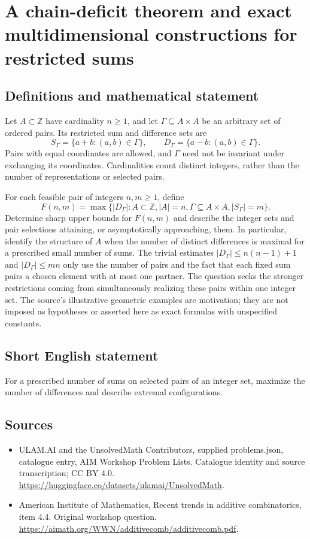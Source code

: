 \documentclass[11pt,a4paper]{article}
\begin{document}
\section*{A chain-deficit theorem and exact multidimensional constructions for restricted sums}\label{statement}

\subsection{Definitions and mathematical statement}
Let $A\subset\mathbb Z$ have cardinality $n\geq1$, and let $\Gamma\subseteq A\times A$ be an arbitrary set of ordered pairs.
Its restricted sum and difference sets are
\[
 S_\Gamma=\{a+b:(a,b)\in\Gamma\},\qquad
 D_\Gamma=\{a-b:(a,b)\in\Gamma\}.
\]
Pairs with equal coordinates are allowed, and $\Gamma$ need not be invariant under exchanging its coordinates.
Cardinalities count distinct integers, rather than the number of representations or selected pairs.

For each feasible pair of integers $n,m\geq1$, define
\[
 F(n,m)=\max\{|D_\Gamma|:
       A\subset\mathbb Z, |A|=n,
       \Gamma\subseteq A\times A, |S_\Gamma|=m\}.
\]
Determine sharp upper bounds for $F(n,m)$ and describe the integer sets and pair selections attaining, or asymptotically approaching, them.
In particular, identify the structure of $A$ when the number of distinct differences is maximal for a prescribed small number of sums.
The trivial estimates $|D_\Gamma|\leq n(n-1)+1$ and $|D_\Gamma|\leq mn$ only use the number of pairs and the fact that each fixed sum pairs a chosen element with at most one partner.
The question seeks the stronger restrictions coming from simultaneously realizing these pairs within one integer set.
The source's illustrative geometric examples are motivation; they are not imposed as hypotheses or asserted here as exact formulas with unspecified constants.
\subsection{Short English statement}
For a prescribed number of sums on selected pairs of an integer set, maximize the number of differences and describe extremal configurations.
\subsection{Sources}
\begin{itemize}
\item[S1] ULAM.AI and the UnsolvedMath Contributors, supplied problems.json, catalogue entry, AIM Workshop Problem Lists. Catalogue identity and source transcription; CC BY 4.0.
\url{https://huggingface.co/datasets/ulamai/UnsolvedMath}.
\item[S2] American Institute of Mathematics, Recent trends in additive combinatorics, item 4.4. Original workshop question.
\url{https://aimath.org/WWN/additivecomb/additivecomb.pdf}.
\end{itemize}
\end{document}

